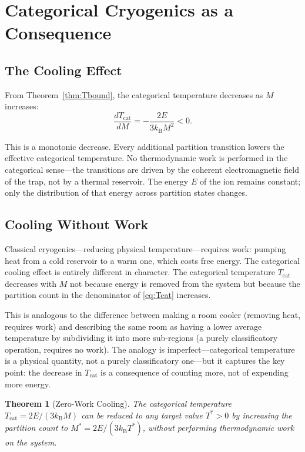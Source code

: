 \documentclass[twocolumn,10pt]{article}
\newtheorem{theorem}{Theorem}[section]
\newcommand{\kB}{k_{\mathrm{B}}}
\newcommand{\Tcat}{T_{\mathrm{cat}}}
\begin{document}
\section{Categorical Cryogenics as a Consequence}
\label{sec:cryogenics}

\subsection{The Cooling Effect}

From Theorem~\ref{thm:Tbound}, the categorical temperature decreases as $M$ increases:
\begin{equation}
    \frac{d\Tcat}{dM} = -\frac{2E}{3\kB M^2} < 0.
\end{equation}

This is a monotonic decrease. Every additional partition transition lowers the effective categorical temperature. No thermodynamic work is performed in the categorical sense---the transitions are driven by the coherent electromagnetic field of the trap, not by a thermal reservoir. The energy $E$ of the ion remains constant; only the distribution of that energy across partition states changes.

\subsection{Cooling Without Work}

Classical cryogenics---reducing physical temperature---requires work: pumping heat from a cold reservoir to a warm one, which costs free energy. The categorical cooling effect is entirely different in character. The categorical temperature $\Tcat$ decreases with $M$ not because energy is removed from the system but because the partition count in the denominator of \eqref{eq:Tcat} increases.

This is analogous to the difference between making a room cooler (removing heat, requires work) and describing the same room as having a lower average temperature by subdividing it into more sub-regions (a purely classificatory operation, requires no work). The analogy is imperfect---categorical temperature is a physical quantity, not a purely classificatory one---but it captures the key point: the decrease in $\Tcat$ is a consequence of counting more, not of expending more energy.

\begin{theorem}[Zero-Work Cooling]
\label{thm:zerowork}
The categorical temperature $\Tcat = 2E/(3\kB M)$ can be reduced to any target value $T^* > 0$ by increasing the partition count to $M^* = 2E/(3\kB T^*)$, without performing thermodynamic work on the system.
\end{theorem}
\end{document}
